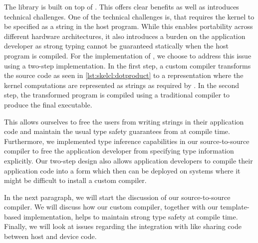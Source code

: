The \SkelCL library is built on top of \OpenCL.
This offers clear benefits as well as introduces technical challenges.
One of the technical challenges is, that \OpenCL requires the kernel to be specified as a string in the host program.
While this enables portability across different hardware architectures, it also introduces a burden on the application developer as strong typing cannot be guaranteed statically when the host program is compiled.
For the implementation of \SkelCL, we choose to address this issue using a two-step implementation.
In the first step, a custom compiler transforms the source code as seen in \autoref{lst:skelcl:dotproduct} to a representation where the kernel computations are represented as strings as required by \OpenCL.
In the second step, the transformed program is compiled using a traditional \Cpp compiler to produce the final executable.

This allows ourselves to free the users from writing strings in their application code and maintain the usual type safety guarantees from \Cpp at compile time.
Furthermore, we implemented type inference capabilities in our source-to-source compiler to free the application developer from specifying type information explicitly.
Our two-step design also allows application developers to compile their application code into a form which then can be deployed on systems where it might be difficult to install a custom compiler.

In the next paragraph, we will start the discussion of our source-to-source compiler.
We will discuss how our custom compiler, together with our template-based implementation, helps to maintain strong type safety at compile time.
Finally, we will look at issues regarding the integration with \Cpp like sharing code between host and device code.

